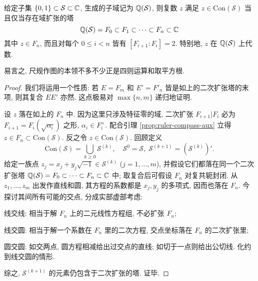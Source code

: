 \begin{theorem}\label{prop:characterization-constructible}
	给定子集 $\{0,1\} \subset \mathcal{S} \subset \mathbb{C}$, 生成的子域记为 $\mathbb{Q}(\mathcal{S})$, 则复数 $z$ 满足 $z \in \mathrm{Con}(\mathcal{S})$ 当且仅当存在域扩张的塔
	\[ \mathbb{Q}(\mathcal{S}) = F_0 \subset F_1 \subset \cdots \subset F_n \subset \mathbb{C} \]
	其中 $z \in F_n$, 而且对每个 $0 \leq i < n$ 皆有 $[F_{i+1} : F_i] = 2$. 特别地, $z$ 在 $\mathbb{Q}(\mathcal{S})$ 上代数.
\end{theorem}
易言之, 尺规作图的本领不多不少正是四则运算和取平方根.
\begin{proof}
	我们将运用一个性质: 若 $E = F_m$ 和 $E' = F'_n$ 皆是如上的二次扩张塔的末项, 则其复合 $EE'$ 亦然. 这点极易对 $\max\{n,m\}$ 递归地证明.

	设 $z$ 落在如上的 $F_n$ 中. 因为这里只涉及特征零的域, 二次扩张 $F_{i+1}|F_i$ 必为 $F_{i+1} = F_i(\sqrt{\alpha_i})$ 之形, $\alpha_i \in F_i^\times$. 配合引理 \ref{prop:ruler-compass-aux} 立得 $z \in F_n \subset \text{Con}(\mathcal{S})$. 反之令 $z \in \text{Con}(\mathcal{S})$. 回顾定义
	\[ \text{Con}(\mathcal{S}) = \bigcup_{k \geq 0} \mathcal{S}^{(k)}, \quad \mathcal{S}^0 = \mathcal{S}, \; \mathcal{S}^{(k+1)} = (\mathcal{S}^{(k)})'. \]
	给定一族点 $z_j = x_j + y_j \sqrt{-1} \in \mathcal{S}^{(k)}$ ($j=1,\ldots, m$), 并假设它们都落在同一个二次扩张塔 $\mathbb{Q}(\mathcal{S}) = F_0 \subset \cdots \subset F_n \subset \mathbb{C}$ 中; 取复合后可假设 $F_n$ 对复共轭封闭. 从 $z_1, \ldots, z_m$ 出发作直线和圆, 其方程的系数都是 $x_j, y_j$ 的多项式, 因而也落在 $F_n$. 今探讨其间所有可能的交点, 分成实部虚部考虑:
	\begin{compactenum}[(a)]
		\item 线交线: 相当于解 $F_n$ 上的二元线性方程组, 不必扩张 $F_n$;
		\item 线交圆: 相当于解一个系数在 $F_n$ 里的二次方程, 交点坐标落在 $F_n$ 的二次扩张里;
		\item 圆交圆: 如交两点, 圆方程相减给出过交点的直线; 如切于一点则给出公切线. 化约到线交圆的情形.
	\end{compactenum}
	综之, $\mathcal{S}^{(k+1)}$ 的元素仍包含于二次扩张的塔. 证毕.
\end{proof}

